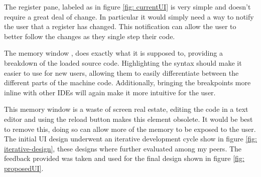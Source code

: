 The register pane, labeled as  in figure \ref{fig: currentUI} is very simple and doesn't require a great deal of change. In particular it would simply need a way to notify the user that a register has changed. This notification can allow the user to better follow the changes as they single step their code.

The memory window , does exactly what it is supposed to, providing a breakdown of the loaded source code. Highlighting the syntax should make it easier to use for new users, allowing them to easily differentiate between the different parts of the machine code. Additionally, bringing the breakpoints more inline with other IDEs will again make it more intuitive for the user.

This memory window is a waste of screen real estate, editing the code in a text editor and using the reload button makes this element obsolete. It would be best to remove this, doing so can allow more of the memory to be exposed to the user.
The initial UI design underwent an iterative development cycle show in figure \ref{fig: iterative-design}, these designs where further evaluated among my peers. The feedback provided was taken and used for the final design shown in figure \ref{fig: proposedUI}.
